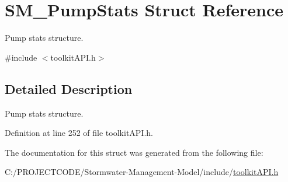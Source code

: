 \hypertarget{struct_s_m___pump_stats}{}\section{S\+M\+\_\+\+Pump\+Stats Struct Reference}
\label{struct_s_m___pump_stats}


Pump stats structure.  




{\ttfamily \#include $<$toolkit\+A\+P\+I.\+h$>$}



\subsection{Detailed Description}
Pump stats structure. 

Definition at line 252 of file toolkit\+A\+P\+I.\+h.



The documentation for this struct was generated from the following file\+:\begin{DoxyCompactItemize}
\item 
C\+:/\+P\+R\+O\+J\+E\+C\+T\+C\+O\+D\+E/\+Stormwater-\/\+Management-\/\+Model/include/\hyperlink{toolkit_a_p_i_8h}{toolkit\+A\+P\+I.\+h}\end{DoxyCompactItemize}
